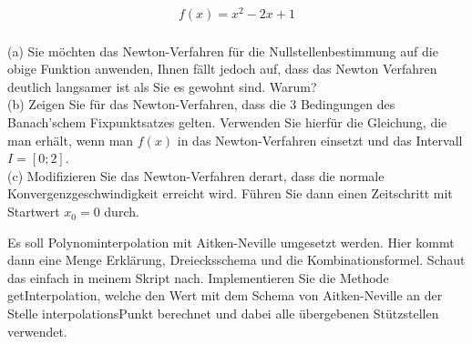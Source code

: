 \documentclass{scrartcl}
\begin{document}
	
	
	\begin{align*}
		f(x) = x^2 - 2x + 1
	\end{align*}
	\\
	(a)
	Sie möchten das Newton-Verfahren für die Nullstellenbestimmung auf die obige Funktion anwenden, Ihnen fällt jedoch auf, dass das Newton Verfahren deutlich langsamer ist als Sie es gewohnt sind. Warum?
	\lbreak
	\\
	(b)
	Zeigen Sie für das Newton-Verfahren, dass die 3 Bedingungen des Banach'schem Fixpunktsatzes gelten. Verwenden Sie hierfür die Gleichung, die man erhält, wenn man $f(x)$ in das Newton-Verfahren einsetzt und das Intervall $I=[0;2]$.
	\lbreak
	\\
	(c)
	Modifizieren Sie das Newton-Verfahren derart, dass die normale Konvergenzgeschwindigkeit erreicht wird.
	\n 
	Führen Sie dann einen Zeitschritt mit Startwert $x_0=0$ durch.


%	
%	



	Es soll Polynominterpolation mit Aitken-Neville umgesetzt werden.
	\n 
	Hier kommt dann eine Menge Erklärung, Dreiecksschema und die Kombinationsformel. Schaut das einfach in meinem Skript nach.
	\n 
	Implementieren Sie die Methode getInterpolation, welche den Wert mit dem Schema von Aitken-Neville an der Stelle interpolationsPunkt berechnet und dabei alle übergebenen Stützstellen verwendet.
	
\end{document}
